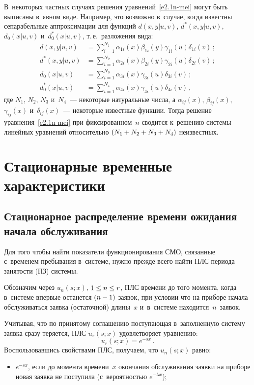 \begin{multicols}{2}
В~некоторых частных случаях решения уравнений~\eqref{e2.1n-mei}  могут быть выписаны в~явном виде.
 Например, это возможно в~случае, когда  известны сепарабельные аппроксимации для функций
 $d(x,y|u,v)$, $d^*(x,y|u,v)$, $d_0(x|u,v)$ и~$d_0^*(x|u,v)$,
 т.\,е.\ разложения вида:
\begin{align*}
d(x,y|u,v)&=\sum\limits_{i=1}^{N_1} \alpha_{1i}(x)\beta_{1i}(y)\gamma_{1i}(u)\delta_{1i}(v)\,;
\\
d^*(x,y|u,v)&=\sum\limits_{i=1}^{N_2} \alpha_{2i}(x)\beta_{2i}(y)\gamma_{2i}(u)\delta_{2i}(v)\,;
\\
d_0(x|u,v)&=\sum\limits_{i=1}^{N_3} \alpha_{3i}(x)\gamma_{3i}(u)\delta_{3i}(v)\,;
\\
d_0^*(x|u,v)&=\sum\limits_{i=1}^{N_4} \alpha_{4i}(x)\gamma_{4i}(u)\delta_{4i}(v)\,,
\end{align*}
где $N_1$, $N_2$, $N_3$ и~$N_4$~--- некоторые натуральные чис\-ла,
а $\alpha_{ij}(x)$, $\beta_{ij}(x)$, $\gamma_{ij}(x)$ и~$\delta_{ij}(x)$~--- некоторые
известные функции.
Тогда решение уравнения~\eqref{e2.1n-mei} при фиксированном~$n$
сводится к~решению системы линейных уравнений относительно
$(N_1\hm+N_2\hm+N_3\hm+N_4)$ неизвестных.


\section{Стационарные временные характеристики}

\subsection{Стационарное распределение времени ожидания начала обслуживания}

Для того чтобы найти показатели функционирования СМО,
связанные с~временем пребывания в~системе, нужно прежде
всего найти ПЛС периода занятости (ПЗ) системы.

Обозначим через $u_n(s;x)$, $1 \hm\le n \hm\le r$,  ПЛС
времени до того момента, когда в~системе впервые останется $(n\hm-1)$ заявок,
при условии что на приборе начала обслуживаться заявка
(остаточной) длины~$x$ и~в~системе находится~$n$~заявок.

Учитывая, что по принятому соглашению поступающая в~заполненную
систему заявка сразу теряется, ПЛС  $u_r(s;x)$ удовлетворяет уравнению:
\begin{equation}
\label{t1-mei}
u_r(s;x)=e^{-s x}\,.
\end{equation}
Воспользовавшись свойствами ПЛС, получаем, что $u_{n}(s;x)$ равно:
\begin{itemize}
\item $e^{-s x}$, если до момента времени~$x$
окончания обслуживания заявки на приборе
новая заявка не поступила (с~вероятностью $e^{-\lambda x}$);


\end{itemize}
\end{multicols}
